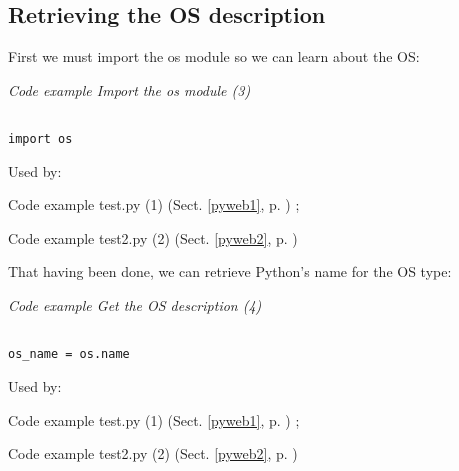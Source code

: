 \documentclass{article}
\begin{document}
\subsection{Retrieving the OS description}

First we must import the os module so we can learn about the OS:

\label{pyweb3}
    \begin{flushleft}
    \textit{Code example Import the os module (3)}
    \begin{Verbatim}[commandchars=\\\{\},codes={\catcode`$=3\catcode`^=7},frame=single]

import os

    \end{Verbatim}
    
    \footnotesize
    Used by:
    \begin{list}{}{}
    
    \item Code example test.py (1) (Sect. \ref{pyweb1}, p. \pageref{pyweb1})
; 
    \item Code example test2.py (2) (Sect. \ref{pyweb2}, p. \pageref{pyweb2})

    \end{list}
    \normalsize
    
    \end{flushleft}


That having been done, we can retrieve Python's name for the OS type:

\label{pyweb4}
    \begin{flushleft}
    \textit{Code example Get the OS description (4)}
    \begin{Verbatim}[commandchars=\\\{\},codes={\catcode`$=3\catcode`^=7},frame=single]

os_name = os.name

    \end{Verbatim}
    
    \footnotesize
    Used by:
    \begin{list}{}{}
    
    \item Code example test.py (1) (Sect. \ref{pyweb1}, p. \pageref{pyweb1})
; 
    \item Code example test2.py (2) (Sect. \ref{pyweb2}, p. \pageref{pyweb2})

    \end{list}
    \normalsize
    
    \end{flushleft}
\end{document}
